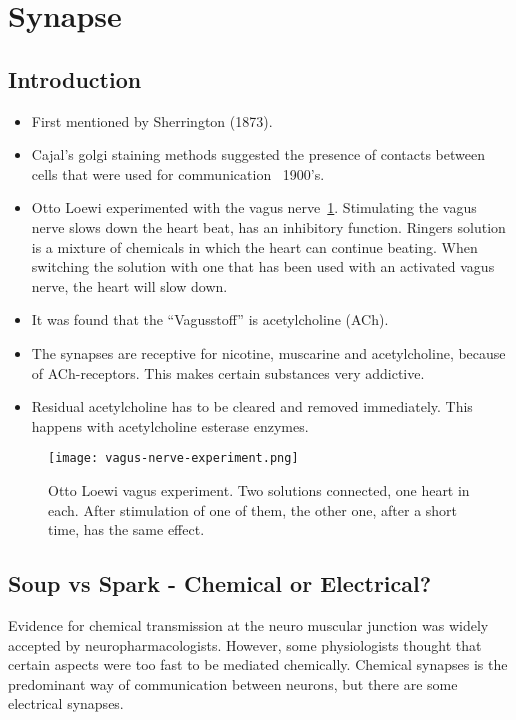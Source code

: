 \documentclass[main]{subfiles}
\begin{document}

\section{Synapse}
\subsection{Introduction}
\begin{itemize}[noitemsep,nolistsep]
	\item First mentioned by Sherrington (1873).
	\item Cajal's golgi staining methods suggested the presence of contacts between cells that were used for communication ~1900's.
	\item Otto Loewi experimented with the vagus nerve~\ref{fig:vagus-experiment}.
	\subitem Stimulating the vagus nerve slows down the heart beat, has an inhibitory function.
	\subitem Ringers solution is a mixture of chemicals in which the heart can continue beating.
	\subitem When switching the solution with one that has been used with an activated vagus nerve, the heart will slow down.
	\item It was found that the ``Vagusstoff'' is acetylcholine (ACh).
	\item The synapses are receptive for nicotine, muscarine and acetylcholine, because of ACh-receptors. This makes certain substances very addictive.
	\item Residual acetylcholine has to be cleared and removed immediately. This happens with acetylcholine esterase enzymes.
\end{itemize}

\begin{figure}[H]
	\centering
 	\texttt{[image: vagus-nerve-experiment.png]}
 	\caption{Otto Loewi vagus experiment. Two solutions connected, one heart in each. After stimulation of one of them, the other one, after a short time, has the same effect.}
 	\label{fig:vagus-experiment}
\end{figure} 

\subsection{Soup vs Spark - Chemical or Electrical?}
Evidence for chemical transmission at the neuro muscular junction was widely accepted by neuropharmacologists. However, some physiologists thought that certain aspects were too fast to be mediated chemically.
Chemical synapses is the predominant way of communication between neurons, but there are some electrical synapses.
\end{document}
